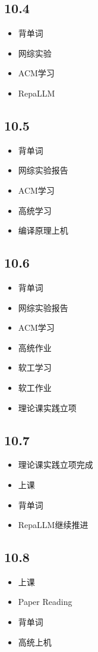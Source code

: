 \documentclass[UTF8]{ctexart}
\begin{document}
\subsection*{10.4}
\begin{itemize}
    \item 背单词
    \item 网综实验
    \item ACM学习
    \item RepaLLM
\end{itemize}

\subsection*{10.5}
\begin{itemize}
    \item 背单词
    \item 网综实验报告
    \item ACM学习
    \item 高统学习
    \item 编译原理上机
\end{itemize}
\subsection*{10.6}
\begin{itemize}
    \item 背单词
    \item 网综实验报告
    \item ACM学习
    \item 高统作业
    \item 软工学习
    \item 软工作业
    \item 理论课实践立项
\end{itemize}
\subsection*{10.7}
\begin{itemize}
    \item 理论课实践立项完成
    \item 上课
    \item 背单词
    \item RepaLLM继续推进
\end{itemize}

\subsection*{10.8}
\begin{itemize}
    \item 上课
    \item Paper Reading
    \item 背单词
    \item 高统上机
\end{itemize}
\end{document}
